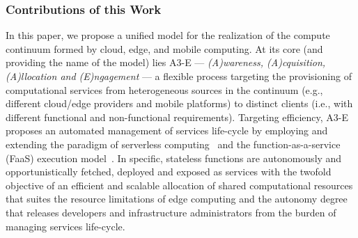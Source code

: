 %


\subsubsection*{Contributions of this Work}


In this paper, we propose a unified model for the realization of the compute continuum formed by cloud, edge, and mobile computing. At its core (and providing the name of the model) lies A3-E --- \textit{(A)wareness, (A)cquisition, (A)llocation and (E)ngagement} --- a flexible process targeting the provisioning of computational services from heterogeneous sources in the continuum (e.g., different cloud/edge providers and mobile platforms) to distinct clients (i.e., with different functional and non-functional requirements). 
Targeting efficiency, A3-E proposes an automated management of services life-cycle by employing and extending the paradigm of serverless computing~\cite{Hendrickson:2016,baldini2017serverless,GarrigaMendonca2017} and the function-as-a-service (FaaS) execution model~\cite{MateosFaaster17}. In specific, stateless functions are autonomously and opportunistically fetched, deployed and exposed as services with the twofold objective of an efficient and scalable allocation of shared computational resources that suites the resource limitations of edge computing and the autonomy degree that releases developers and infrastructure administrators from the burden of managing services life-cycle.


